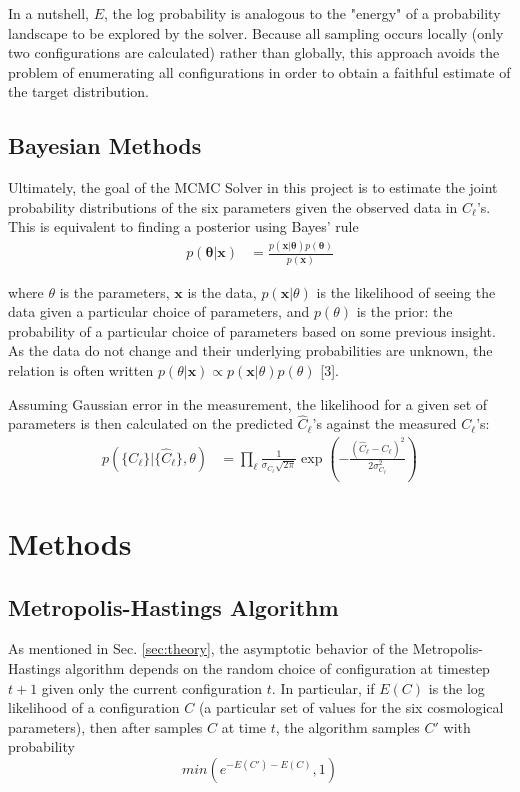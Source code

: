 \documentclass[aps,prd,final,twocolumn]{revtex4}
\newcommand{\refsec}[1]{Sec. \ref{sec:#1}}
\begin{document}
In a nutshell, $E$, the log probability is analogous to the "energy" of a probability landscape to be explored by the solver. Because all sampling occurs locally (only two configurations are calculated) rather than globally, this approach avoids the problem of enumerating all configurations in order to obtain a faithful estimate of the target distribution.

\subsection{Bayesian Methods}
Ultimately, the goal of the MCMC Solver in this project is to estimate the joint probability distributions of the six parameters given the observed data in $C_{\ell}$'s. This is equivalent to finding a posterior using Bayes' rule
\begin{align}
p(\mathbf{\theta}|\mathbf{x}) &= \frac{p(\mathbf{x}|\mathbf{\theta})p(\mathbf{\theta})}{p(\mathbf{x})}\label{lon12}
\end{align}

where $\theta$ is the parameters, $\mathbf{x}$ is the data, $p(\mathbf{x}|\theta)$ is the likelihood of seeing the data given a particular choice of parameters, and $p(\theta)$ is the prior: the probability of a particular choice of parameters based on some previous insight. As the data do not change and their underlying probabilities are unknown, the relation is often written $p(\theta|\mathbf{x})\propto p(\mathbf{x}|\theta)p(\theta)$ [3].

Assuming Gaussian error in the measurement, the likelihood for a given set of parameters is then calculated on the predicted $\hat{C}_{\ell}$'s against the measured $C_{\ell}$'s:
\begin{align}
p(\{C_{\ell}\}|\{\hat{C}_{\ell}\},\theta) &=\prod_{\ell} \frac{1}{\sigma_{C_{\ell}}\sqrt{2\pi}}\exp\left(-\frac{(\hat{C}_{\ell}-C_{\ell})^2}{2\sigma_{C_{\ell}}^2}\right)\label{lon13}
\end{align}

\section{Methods \label{sec:methods} }

\subsection{Metropolis-Hastings Algorithm}
As mentioned in \refsec{theory}, the asymptotic behavior of the Metropolis-Hastings algorithm depends on the random choice of configuration at timestep $t+1$ given only the current configuration $t$. In particular, if $E(C)$ is the log likelihood of a configuration $C$ (a particular set of values for the six cosmological parameters), then after samples $C$ at time $t$, the algorithm samples $C'$ with probability
\[min\left(e^{-E(C')-E(C)},1\right)\]
\end{document}
